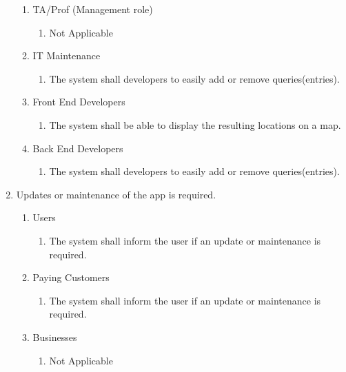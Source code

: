 \documentclass[titlepage]{article}
\begin{document}
\begin{enumerate}[\textbf{{BE}1.}]
\begin{enumerate}[\textbf{{VP2}.1}]
		\item TA/Prof (Management role)
			\begin{enumerate}
				\item Not Applicable
			\end{enumerate}
		
		\item IT Maintenance
			\begin{enumerate}
				\item The system shall developers to easily add or remove queries(entries).
			\end{enumerate}
		
		\item Front End Developers
			\begin{enumerate}
				\item The system shall be able to display the resulting locations on a map.				\end{enumerate}
			
		\item Back End Developers
			\begin{enumerate}
				\item The system shall developers to easily add or remove queries(entries).
			\end{enumerate}
	\end{enumerate}
	
	\item Updates or maintenance of the app is required.
	\begin{enumerate}[\textbf{{VP3}.1}]
				
		\item Users
			\begin{enumerate}
				\item The system shall inform the user if an update or maintenance is required.
			\end{enumerate}
		
		\item Paying Customers
			\begin{enumerate}
				\item The system shall inform the user if an update or maintenance is required.
			\end{enumerate}
		
		\item Businesses
			\begin{enumerate}
				\item Not Applicable
			\end{enumerate}
		

\end{enumerate}
\end{enumerate}
\end{document}
